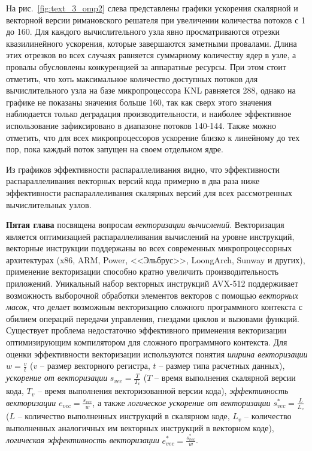 \documentclass[a4paper,14pt]{extarticle}                     %
\theoremstyle{plain}                                         %
\begin{document}
На рис.~\ref{fig:text_3_omp2} слева представлены графики ускорения скалярной и векторной версии римановского решателя при увеличении количества потоков с 1 до 160.
Для каждого вычислительного узла явно просматриваются отрезки квазилинейного ускорения, которые завершаются заметными провалами.
Длина этих отрезков во всех случаях равняется суммарному количеству ядер в узле, а провалы обусловлены конкуренцией за аппаратные ресурсы.
При этом стоит отметить, что хоть максимальное количество доступных потоков для вычислительного узла на базе микропроцессора KNL равняется 288, однако на графике не показаны значения больше 160, так как сверх этого значения наблюдается только деградация производительности, и наиболее эффективное использование зафиксировано в диапазоне потоков 140-144.
Также можно отметить, что для всех микропроцессоров ускорение близко к линейному до тех пор, пока каждый поток запущен на своем отдельном ядре.

Из графиков эффективности распараллеливания видно, что эффективности распараллеливания векторных версий кода примерно в два раза ниже эффективности распараллеливания скалярных версий для всех рассмотренных вычислительных узлов.


\newpage
\textbf{Пятая глава} посвящена вопросам \textit{векторизации вычислений}.
Векторизация является оптимизацией распараллеливания вычислений на уровне инструкций, векторные инструкции поддержаны во всех современных микропроцессорных архитектурах (x86, ARM, Power, <<Эльбрус>>, LoongArch, Sunway и других), применение векторизации способно кратно увеличить производительность приложений.
Уникальный набор векторных инструкций AVX-512 поддерживает возможность выборочной обработки элементов векторов с помощью \textit{векторных масок}, что делает возможным векторизацию сложного программного контекста с обилием операций передачи управления, гнездами циклов и вызовами функций.
Существует проблема недостаточно эффективного применения векторизации оптимизирующим компилятором для сложного программного контекста.
Для оценки эффективности векторизации используются понятия \textit{ширина векторизации} $w = \frac{v}{t}$ ($v$ -- размер векторного регистра, $t$ -- размер типа расчетных данных), \textit{ускорение от векторизации} $s_{vec} = \frac{T}{T_v}$ ($T$ -- время выполнения скалярной версии кода, $T_v$ -- время выполнения векторизованной версии кода), \textit{эффективность векторизации} $e_{vec} = \frac{s_{vec}}{w}$, а также \textit{логическое ускорение от векторизации} $s_{vec}^{*} = \frac{L}{L_v}$ ($L$ -- количество выполненных инструкций в скалярном коде, $L_v$ -- количество выполненных аналогичных им векторных инструкций в векторном коде), \textit{логическая эффективность векторизации} $e_{vec}^{*} = \frac{s_{vec}^{*}}{w}$.
\end{document}

